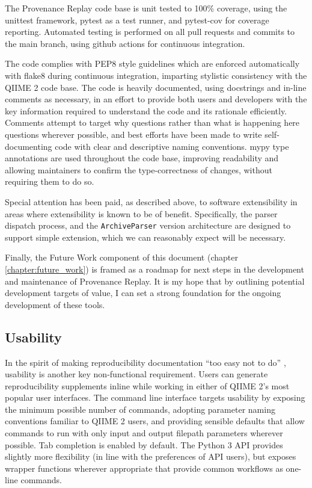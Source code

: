 The Provenance Replay code base is unit tested to 100\% coverage, using
the unittest \parencite{python_software_foundation_unittest_2001} framework,
pytest \parencite{krekel_pytest_2015} as a test runner, and pytest-cov \parencite{pytest-cov_contributors_welcome_2016}
for coverage reporting. Automated testing is performed on all pull requests and
commits to the main branch, using github actions
\parencite{github_features_2022} for continuous integration.

The code complies with PEP8 style guidelines \parencite{van_rossum_pep_2001}
which are enforced automatically with flake8 during continuous integration,
imparting stylistic consistency with the QIIME 2 code base. The code is heavily
documented, using docstrings and in-line comments as necessary, in an effort to
provide both users and developers with the key information required to
understand the code and its rationale efficiently. Comments attempt to target
why questions rather than what is happening here questions wherever possible,
and best efforts have been made to write self-documenting code with clear and
descriptive naming conventions. mypy type annotations \parencite{lehtosalo_mypy_2014}
are used throughout the code base, improving readability and allowing
maintainers to confirm the type-correctness of changes, without requiring them
to do so.

Special attention has been paid, as described above, to software extensibility
in areas where extensibility is known to be of benefit. Specifically, the parser
dispatch process, and the \texttt{ArchiveParser} version architecture are designed to
support simple extension, which we can reasonably expect will be necessary. 

Finally, the Future Work component of this document (chapter \ref{chapter:future_work})
is framed as a roadmap for next steps in the development and maintenance of
Provenance Replay. It is my hope that by outlining potential development targets
of value, I can set a strong foundation for the ongoing development of these
tools.


\subsection{Usability}

In the spirit of making reproducibility documentation “too easy not to do” \parencite[19]{whitaker_turing_2019},
usability is another key non-functional requirement. Users can generate
reproducibility supplements inline while working in either of QIIME 2’s most
popular user interfaces. The command line interface targets usability by
exposing the minimum possible number of commands, adopting parameter naming
conventions familiar to QIIME 2 users, and providing sensible defaults that
allow commands to run with only input and output filepath parameters wherever
possible. Tab completion is enabled by default. The Python 3 API provides
slightly more flexibility (in line with the preferences of API users), but
exposes wrapper functions wherever appropriate that provide common workflows as
one-line commands.


